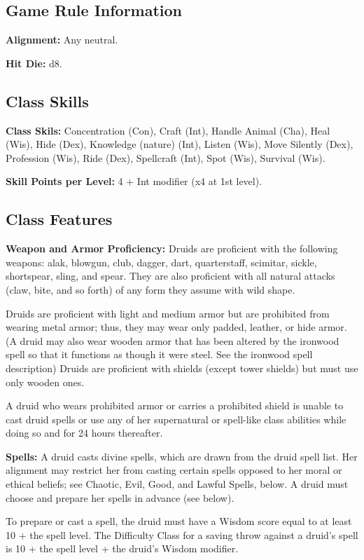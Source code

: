 \subsection{Game Rule Information}

\textbf{Alignment:} Any neutral.

\textbf{Hit Die:} d8.

\subsection{Class Skills}

\textbf{Class Skils:} Concentration (Con), Craft (Int), Handle Animal (Cha), Heal (Wis), Hide (Dex), Knowledge (nature) (Int), Listen (Wis), Move Silently (Dex), Profession (Wis), Ride (Dex), Spellcraft (Int), Spot (Wis), Survival (Wis).

\textbf{Skill Points per Level:} 4 + Int modifier (x4 at 1st level).

\subsection{Class Features}

\textbf{Weapon and Armor Proficiency:} Druids are proficient with the following weapons: alak, blowgun, club, dagger, dart, quarterstaff, scimitar, sickle, shortspear, sling, and spear. They are also proficient with all natural attacks (claw, bite, and so forth) of any form they assume with wild shape.

Druids are proficient with light and medium armor but are prohibited from wearing metal armor; thus, they may wear only padded, leather, or hide armor. (A druid may also wear wooden armor that has been altered by the ironwood spell so that it functions as though it were steel. See the ironwood spell description) Druids are proficient with shields (except tower shields) but must use only wooden ones.

A druid who wears prohibited armor or carries a prohibited shield is unable to cast druid spells or use any of her supernatural or spell-like class abilities while doing so and for 24 hours thereafter.

\textbf{Spells:} A druid casts divine spells, which are drawn from the druid spell list. Her alignment may restrict her from casting certain spells opposed to her moral or ethical beliefs; see Chaotic, Evil, Good, and Lawful Spells, below. A druid must choose and prepare her spells in advance (see below).

To prepare or cast a spell, the druid must have a Wisdom score equal to at least 10 + the spell level. The Difficulty Class for a saving throw against a druid's spell is 10 + the spell level + the druid's Wisdom modifier.

